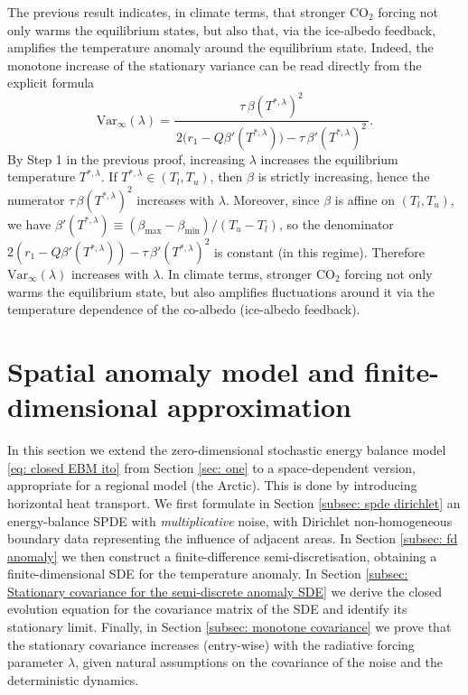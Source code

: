 \documentclass[10pt]{amsart}
\numberwithin{equation}{section}
\begin{document}
The previous result indicates, in climate terms, that stronger $\mathrm{CO}_2$ forcing not only warms the equilibrium states, but also that, via the ice-albedo feedback, amplifies the temperature anomaly around the equilibrium state. Indeed, the monotone increase of the stationary variance can be read directly from the explicit formula
$$
\mathrm{Var}_\infty(\lambda)
=\frac{\tau\,\beta(T^{*,\lambda})^2}{\,2\bigl(r_1-Q\beta'(T^{*,\lambda})\bigr)-\tau\,\beta'(T^{*,\lambda})^2\,}.
$$
By Step 1 in the previous proof, increasing $\lambda$ increases the equilibrium temperature $T^{*,\lambda}$. If $T^{*,\lambda}\in (T_l,T_u)$, then $\beta$ is strictly increasing, hence the numerator
$\tau\,\beta(T^{*,\lambda})^2$ increases with $\lambda$. Moreover, since $\beta$ is affine on $(T_l,T_u)$, we have $\beta'(T^{*,\lambda})\equiv (\beta_{\max}-\beta_{\min})/(T_u-T_l)$,
so the denominator $2(r_1-Q\beta'(T^{*,\lambda}))-\tau\,\beta'(T^{*,\lambda})^2$ is constant (in this regime). Therefore $\mathrm{Var}_\infty(\lambda)$ increases with $\lambda$. In climate terms, stronger $\mathrm{CO}_2$ forcing not only warms the equilibrium state, but also amplifies fluctuations around it via the temperature dependence of the co-albedo (ice-albedo feedback).












\section{Spatial anomaly model and finite-dimensional approximation} 
\label{sec: two}
In this section we extend the zero-dimensional stochastic energy balance model \eqref{eq: closed EBM ito} from Section \ref{sec: one} to a space-dependent version, appropriate for a regional model (the Arctic). This is done by introducing horizontal heat transport. We first formulate in Section \ref{subsec: spde dirichlet} an energy-balance SPDE with \emph{multiplicative} noise, with Dirichlet non-homogeneous boundary data representing the influence of adjacent areas. In Section \ref{subsec: fd anomaly} we then construct a finite-difference semi-discretisation, obtaining a finite-dimensional SDE for the temperature anomaly. In Section \ref{subsec: Stationary covariance for the semi-discrete anomaly SDE} we derive the closed evolution equation for the covariance matrix of the SDE and identify its stationary limit. Finally, in Section \ref{subsec: monotone covariance} we prove that the stationary covariance increases  (entry-wise) with the radiative forcing parameter $\lambda$, given natural assumptions on the covariance of the noise and the deterministic dynamics.
\end{document}
